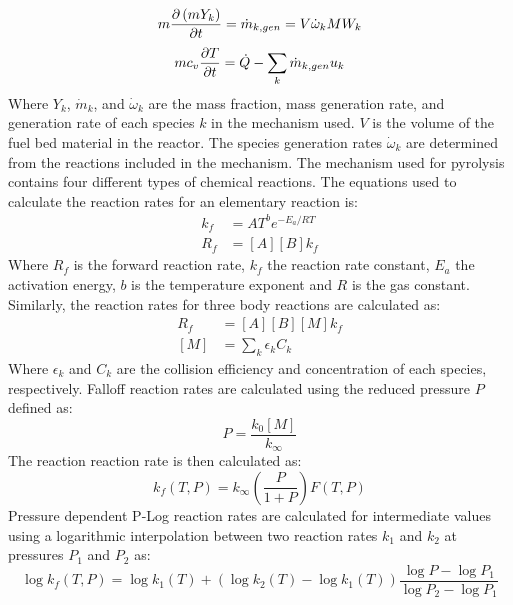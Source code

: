         \begin{equation}
            m \pder[\left( m Y_k \right)]{t} = \dot{m}_{k, gen} = V \dot{\omega}_k MW_k
            \label{eqn:speciesMass4}
        \end{equation}
        \begin{equation}
            mc_{v} \pder[T]{t} = \dot{Q} - \sum_{k} \dot{m}_{k,gen}u_k
        \end{equation}
    Where $Y_k$, $\dot{m}_{k}$, and  $\dot{\omega}_k$ are the mass fraction, mass generation rate, and generation rate of each species $k$ in the mechanism used. $V$ is the volume of the fuel bed material in the reactor. The species generation rates $ \dot{\omega}_k$ are determined from the reactions included in the mechanism. The mechanism used for pyrolysis contains four different types of chemical reactions. The equations used to calculate the reaction rates for an elementary reaction is:
        \begin{align}
            k_f &= AT^{b}e^{-E_a/RT}\\
            R_{f} &= [A][B]k_f 
        \end{align}
    Where $R_f$ is the forward reaction rate, $k_f$ the reaction rate constant, $E_a$ the activation energy, $b$ is the temperature exponent and $R$ is the gas constant. Similarly, the reaction rates for three body reactions are calculated as:
        \begin{align}
            R_f &= [A][B][M]k_f \\
            [M] &= \sum_{k}\epsilon_k C_k
        \end{align}
    Where $\epsilon_k$ and $C_k$ are the collision efficiency and concentration of each species, respectively. Falloff reaction rates are calculated using the reduced pressure $P$ defined as:
        \begin{equation}
            P = \frac{k_0[M]}{k_\infty}
        \end{equation}
    The reaction reaction rate is then calculated as:
        \begin{equation}
            k_f (T, P) = k_{\infty} \left( \frac{P}{1+P}\right) F(T,P)
        \end{equation}
      Pressure dependent P-Log reaction rates are calculated for intermediate values using a logarithmic interpolation between two reaction rates $k_1$ and $k_2$ at pressures $P_1$ and $P_2$ as:
        \begin{equation}
            \log k_f(T,P) = \log k_1(T) + (\log k_2(T) - \log k_1(T))\frac{\log P - \log P_1}{\log P_2 - \log P_1}
        \end{equation}

